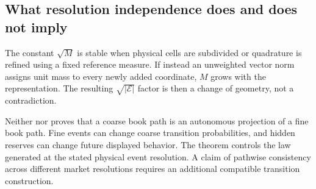 \subsection{What resolution independence does and does not imply}
The constant $\sqrt M$ is stable when physical cells are subdivided or quadrature is refined using a fixed reference measure. If instead an unweighted vector norm assigns unit mass to every newly added coordinate, $M$ grows with the representation. The resulting $\sqrt{|\mathcal E|}$ factor is then a change of geometry, not a contradiction.

Neither  nor  proves that a coarse book path is an autonomous projection of a fine book path. Fine events can change coarse transition probabilities, and hidden reserves can change future displayed behavior. The theorem controls the law generated at the stated physical event resolution. A claim of pathwise consistency across different market resolutions requires an additional compatible transition construction.
